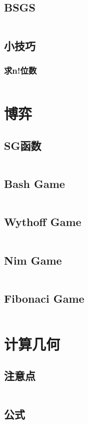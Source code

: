 \documentclass[a4paper,9pt]{article}
\begin{document}
\subsection{BSGS}
\inputminted[]{c++}{Template/Math/bsgs.cpp}
\subsection{小技巧}
\subsubsection{求n!位数}
\inputminted[]{c++}{Template/Math/CountN!.cpp}
\section{博弈}
\subsection{SG函数}
\inputminted[]{c++}{Template/Game/SG.cpp}
\subsection{Bash Game}
\inputminted[]{c++}{Template/Game/Bash.cpp}
\subsection{Wythoff Game}
\inputminted[]{c++}{Template/Game/Wythoff.cpp}
\subsection{Nim Game}
\inputminted[]{c++}{Template/Game/Nim.cpp}
\subsection{Fibonaci Game}
\inputminted[]{c++}{Template/Game/Fibonaci.cpp}
\section{计算几何}
\subsection{注意点}
\inputminted[]{c++}{Template/ComputingGeometry/Note.cpp}
\subsection{公式}
\inputminted[]{c++}{Template/ComputingGeometry/formula.cpp}
\end{document}
